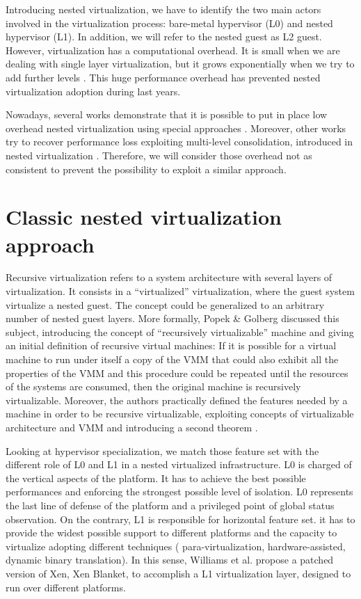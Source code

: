 \documentclass{acm_proc_article-sp} %
\begin{document}
Introducing nested virtualization, we have to identify the two main actors involved in the virtualization process: bare-metal hypervisor (L0) and nested hypervisor (L1). In addition, we will refer to the nested guest as L2 guest. 
However, virtualization has a computational overhead. It is small when we are dealing with single layer virtualization, but it grows exponentially when we try to add further levels \cite{rec:virt}. This huge performance overhead has prevented nested virtualization adoption during last years.
 
Nowadays, several works demonstrate that it is possible to put in place low overhead nested virtualization using special approaches \cite{turtle:ibm} \cite{cloudvisor:zhang}. Moreover, other works try to recover performance loss exploiting multi-level consolidation, introduced in nested virtualization \cite{art:blan}.
Therefore, we will consider those overhead not as consistent to prevent the possibility to exploit a similar approach.

\section{Classic nested virtualization approach}

Recursive virtualization refers to a system architecture with several layers of virtualization. It consists in a ``virtualized'' virtualization, where the guest system virtualize a nested guest. The concept could be generalized to an arbitrary number of nested guest layers.
More formally, Popek \& Golberg \cite{Popek:1974:FRV:361011.361073} discussed this subject, introducing the concept of ``recursively virtualizable'' machine and giving an initial definition of recursive virtual machines: If it is possible for a virtual machine to run under itself a copy of the VMM that could also exhibit all the properties of the VMM and this procedure could be repeated until the resources of the systems are consumed, then the original machine is recursively virtualizable.
Moreover, the authors practically defined the features needed by a machine in order to be recursive virtualizable, exploiting concepts of virtualizable architecture and VMM\label{par:form} and introducing a second theorem \cite{Popek:1974:FRV:361011.361073}.

Looking at hypervisor specialization, we match those feature set with the different role of  L0 and L1 in a nested virtualized infrastructure. 
L0 is charged of the vertical aspects of the platform. It has to achieve  the best possible performances and enforcing the strongest possible level of isolation. L0 represents the last line of defense of the platform and a privileged point of global status observation.
On the contrary, L1 is responsible for horizontal feature set. it has to provide the widest possible support to different platforms and the capacity to virtualize adopting different techniques ( para-virtualization, hardware-assisted, dynamic binary translation). In this sense, Williams et al. propose a patched version of Xen, Xen Blanket, to accomplish a L1 virtualization layer, designed to run over different platforms.
\end{document}
